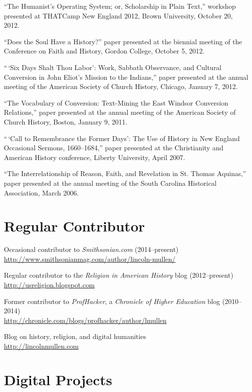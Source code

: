 \documentclass[11pt]{article}
\begin{document}
  ``The Humanist's Operating System; or, Scholarship in Plain Text,''
  workshop presented at THATCamp New England 2012, Brown University,
  October 20, 2012.

  ``Does the Soul Have a History?'' paper presented at the biennial
  meeting of the Conference on Faith and History, Gordon College, October
  5, 2012.

  ``\,`Six Days Shalt Thou Labor': Work, Sabbath Observance, and Cultural
  Conversion in John Eliot's Mission to the Indians,'' paper presented at
  the annual meeting of the American Society of Church History, Chicago,
  January 7, 2012.

  ``The Vocabulary of Conversion: Text-Mining the East Windsor Conversion
  Relations,'' paper presented at the annual meeting of the American
  Society of Church History, Boston, January 9, 2011.

  ``\,`Call to Remembrance the Former Days': The Use of History in New
  England Occasional Sermons, 1660--1684,'' paper presented at the
  Christianity and American History conference, Liberty University, April
  2007.

  ``The Interrelationship of Reason, Faith, and Revelation in St. Thomas
  Aquinas,'' paper presented at the annual meeting of the South Carolina
  Historical Association, March 2006.

  \section{Regular Contributor}

  Occasional contributor to \emph{Smithsonian.com} (2014--present)\\
  \url{http://www.smithsonianmag.com/author/lincoln-mullen/}

  Regular contributor to the \emph{Religion in American History} blog 
  (2012--present)\\
  \url{http://usreligion.blogspot.com}

  Former contributor to \emph{ProfHacker}, a \emph{Chronicle of Higher
    Education} blog (2010--2014)\\
  \url{http://chronicle.com/blogs/profhacker/author/lmullen}

  Blog on history, religion, and digital humanities\\
  \url{http://lincolnmullen.com}

  \section{Digital Projects}
\end{document}
